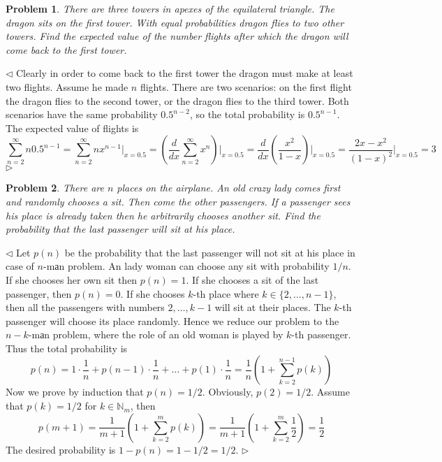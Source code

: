 \documentclass[12pt]{article}
\newtheorem{problem}{Problem}[subsection]
\newenvironment{solution}{\par $\triangleleft$}{$\triangleright$}
\begin{document}
 
\begin{problem} There are three towers in apexes of the equilateral triangle. The dragon sits on the first tower. With equal probabilities dragon flies to two other towers. Find the expected value of the number flights after which the dragon will come back to the first tower.
\end{problem}
\begin{solution} Clearly in order to come back to the first tower the dragon must make at least two flights. Assume he made $n$ flights. There are two scenarios: on the first flight the dragon flies to the second tower, or the dragon flies to the third tower. Both scenarios have the same probability $0.5^{n-2}$, so the total probability is $0.5^{n-1}$. The expected value of flights is
$$
\sum_{n=2}^\infty n 0.5^{n-1}
=\sum_{n=2}^\infty nx^{n-1}\Biggl|_{x=0.5}
=\left(\frac{d}{dx}\sum_{n=2}^\infty x^n\right)\Biggl|_{x=0.5}
=\frac{d}{dx}\left(\frac{x^2}{1-x}\right)\Biggl|_{x=0.5}
=\frac{2x-x^2}{(1-x)^2}\Biggl|_{x=0.5}
=3
$$
\end{solution}
 
 
\begin{problem} There are $n$ places on the airplane. An old crazy lady comes first and randomly chooses a sit. Then come the other passengers. If a passenger sees his place is already taken then he arbitrarily chooses another sit. Find the probability that the last passenger will sit at his place.
\end{problem}
\begin{solution} Let $p(n)$ be the probability that the last passenger will not sit at his place in case of $n$-mаn problem. An lady woman can choose any sit with probability $1/n$. If she chooses her own sit then $p(n) = 1$. If she chooses a sit of the last passenger, then $p(n) = 0$. If she chooses $k$-th place where $k\in\{2,\ldots,n-1\}$, then all the passengers with numbers $2,\ldots, k-1$ will sit at their places. The $k$-th passenger will choose its place randomly. Hence we reduce our problem to the $n-k$-mаn problem, where the role of an old woman is played by $k$-th passenger.
Thus the total probability is
$$
p(n)=1\cdot\frac{1}{n}+p(n-1)\cdot\frac{1}{n}+\ldots+p(1)\cdot\frac{1}{n}=\frac{1}{n}\left(1+\sum_{k=2}^{n-1} p(k)\right)
$$
Now we prove by induction that $p(n)=1/2$. Obviously, $p(2)=1/2$. Assume that $p(k)=1/2$ for $k\in\mathbb{N}_m$, then
$$
p(m+1)=\frac{1}{m+1}\left(1+\sum_{k=2}^{m}p(k)\right)=\frac{1}{m+1}\left(1+\sum_{k=2}^{m}\frac{1}{2}\right)=\frac{1}{2}
$$
The desired probability is $1-p(n)=1-1/2=1/2$.
\end{solution}
 
\end{document}
